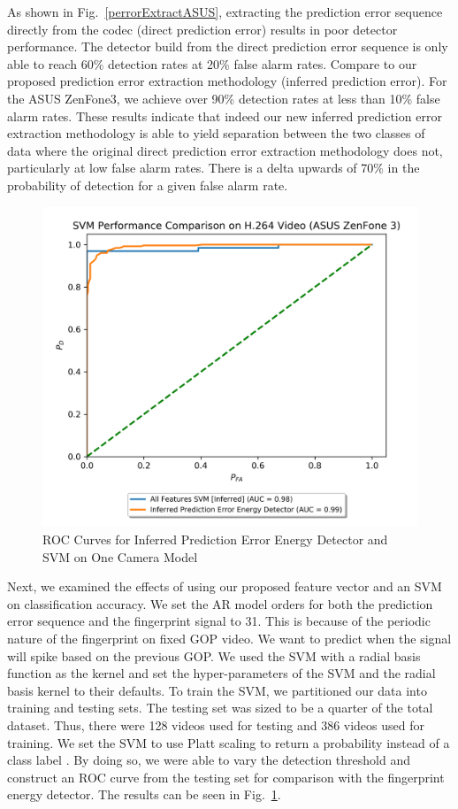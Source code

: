 %
As shown in Fig.~\ref{perrorExtractASUS}, extracting the prediction error sequence directly from the codec (direct prediction error) results in poor detector performance. The detector build from the direct prediction error sequence is only able to reach 60\% detection rates at 20\% false alarm rates. Compare to our proposed prediction error extraction methodology (inferred prediction error). For the ASUS ZenFone3, we achieve over 90\% detection rates at less than 10\% false alarm rates. These results indicate that indeed our new inferred prediction error extraction methodology is able to yield separation between the two classes of data where the original direct prediction error extraction methodology does not, particularly at low false alarm rates. There is a delta upwards of 70\% in the probability of detection for a given false alarm rate.
%
\begin{figure}[htbp]
\centerline{\includegraphics[width=0.7\linewidth]{ExperimentalResults/svm_perror_compare_roc.png}}
\caption{ROC Curves for Inferred Prediction Error Energy Detector and SVM on One Camera Model}
\label{svmrocASUS}
\end{figure}
%
Next, we examined the effects of using our proposed feature vector and an SVM on classification accuracy. We set the AR model orders for both the prediction error sequence and the fingerprint signal to 31. This is because of the periodic nature of the fingerprint on fixed GOP video. We want to predict when the signal will spike based on the previous GOP. We used the SVM with a radial basis function as the kernel and set the hyper-parameters of the SVM and the radial basis kernel to their defaults. To train the SVM, we partitioned our data into training and testing sets. The testing set was sized to be a quarter of the total dataset. Thus, there were 128 videos used for testing and 386 videos used for training. We set the SVM to use Platt scaling to return a probability instead of a class label \cite{plattscaling}. By doing so, we were able to vary the detection threshold and construct an ROC curve from the testing set for comparison with the fingerprint energy detector. The results can be seen in Fig.~\ref{svmrocASUS}.

